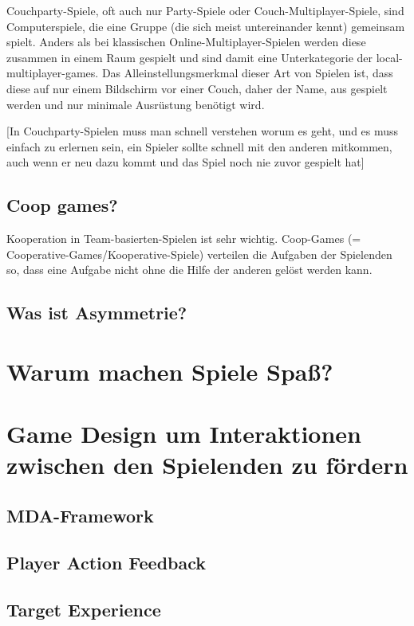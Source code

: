 Couchparty-Spiele, oft auch nur Party-Spiele oder Couch-Multiplayer-Spiele, sind Computerspiele, die eine Gruppe (die sich meist untereinander kennt) gemeinsam spielt. Anders als bei klassischen Online-Multiplayer-Spielen werden diese zusammen in einem Raum gespielt und sind damit eine Unterkategorie der local-multiplayer-games. Das Alleinstellungsmerkmal dieser Art von Spielen ist, dass diese auf nur einem Bildschirm vor einer Couch, daher der Name, aus gespielt werden und nur minimale Ausrüstung benötigt wird.

[In Couchparty-Spielen muss man schnell verstehen worum es geht, und es muss einfach zu erlernen sein, ein Spieler sollte schnell mit den anderen mitkommen, auch wenn er neu dazu kommt und das Spiel noch nie zuvor gespielt hat]

\subsection{Coop games?}

Kooperation in Team-basierten-Spielen ist sehr wichtig. Coop-Games (= Cooperative-Games/Kooperative-Spiele) verteilen die Aufgaben der Spielenden so, dass eine Aufgabe nicht ohne die Hilfe der anderen gelöst werden kann.

\subsection{Was ist Asymmetrie?}

\section{Warum machen Spiele Spaß?}

\section{Game Design um Interaktionen zwischen den Spielenden zu fördern}

\subsection{MDA-Framework}

\subsection{Player Action Feedback}

\subsection{Target Experience}

